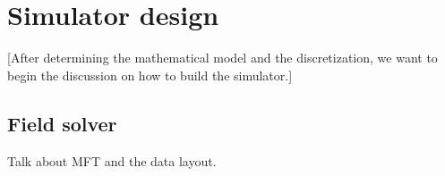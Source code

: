 \chapter{Simulator design}

[After determining the mathematical model and the discretization, we want to
begin the discussion on how to build the simulator.]


\section{Field solver}

Talk about MFT and the data layout.

